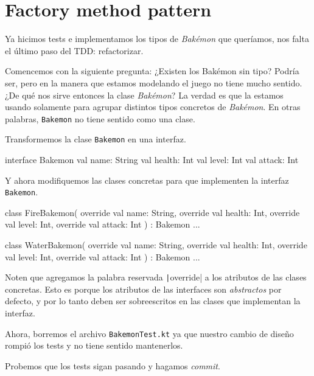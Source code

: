 \section{Factory method pattern}
  \label{sec:factory-method}
  
  Ya hicimos tests e implementamos los tipos de \textit{Bakémon} que queríamos, nos falta el último
  paso del TDD: refactorizar.

  Comencemos con la siguiente pregunta: ¿Existen los Bakémon sin tipo?
  Podría ser, pero en la manera que estamos modelando el juego no tiene mucho sentido.
  ¿De qué nos sirve entonces la clase \textit{Bakémon}?
  La verdad es que la estamos usando solamente para agrupar distintos tipos concretos de 
  \textit{Bakémon}.
  En otras palabras, \texttt{Bakemon} no tiene sentido como una clase.

  Transformemos la clase \texttt{Bakemon} en una interfaz.

  \begin{kotlin}
    interface Bakemon {
      val name: String
      val health: Int
      val level: Int
      val attack: Int
    }
  \end{kotlin}

  Y ahora modifiquemos las clases concretas para que implementen la interfaz \texttt{Bakemon}.

  \begin{kotlin}
    class FireBakemon(
      override val name: String,
      override val health: Int,
      override val level: Int,
      override val attack: Int
    ) : Bakemon {...}
  \end{kotlin}

  \begin{kotlin}
    class WaterBakemon(
      override val name: String,
      override val health: Int,
      override val level: Int,
      override val attack: Int
    ) : Bakemon {...}
  \end{kotlin}

  Noten que agregamos la palabra reservada \texttt|override| a los atributos de las 
  clases concretas.
  Esto es porque los atributos de las interfaces son \textit{abstractos} por defecto, y por lo tanto
  deben ser sobreescritos en las clases que implementan la interfaz.

  Ahora, borremos el archivo \texttt{BakemonTest.kt} ya que nuestro cambio de diseño rompió los
  tests y no tiene sentido mantenerlos.

  Probemos que los tests sigan pasando y hagamos \textit{commit}.

